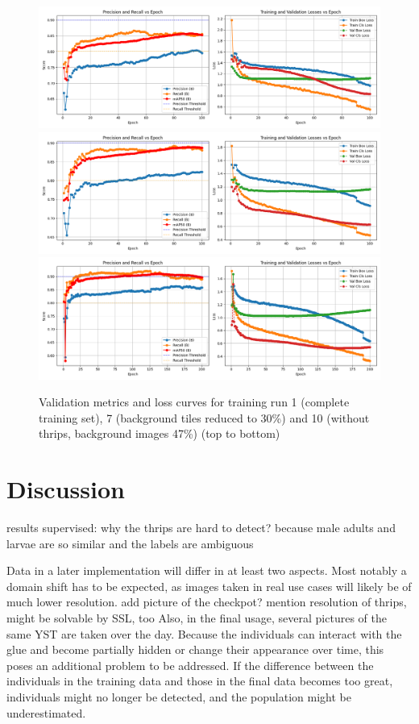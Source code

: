 \documentclass[12pt,a4paper]{article}
\begin{document}
\begin{figure}[H]
    \centering
    \includegraphics[width=\textwidth]{images/prec_recall_train.png} %
    \includegraphics[width=\textwidth]{images/prec_recall_train7.png} %
    \includegraphics[width=\textwidth]{images/prec_recall_train10.png} %
    \caption{Validation metrics and loss curves for training run 1 (complete training set), 7 (background tiles reduced to 30\%) and 10 (without thrips, background images 47\%) (top to bottom)}
    \label{fig:supervised_curves}
\end{figure}


\section{Discussion}

results supervised: why the thrips are hard to detect? because male adults and larvae are so similar and the labels are ambiguous

Data in a later implementation will differ in at least two aspects. Most notably a domain shift has to be expected, as images taken in real use cases will likely be of much lower resolution. 
{\color{red} add picture of the checkpot? mention resolution of thrips, might be solvable by SSL, too
} Also, in the final usage, several pictures of the same YST are taken over the day. Because the individuals can interact with the glue and become partially hidden or change their appearance over time, this poses an additional problem to be addressed. If the difference between the individuals in the training data and those in the final data becomes too great, individuals might no longer be detected, and the population might be underestimated.
\end{document}
